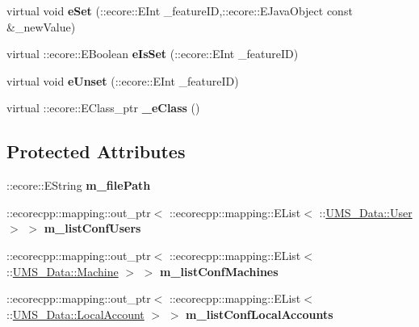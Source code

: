 \begin{DoxyCompactItemize}
\item 
\hypertarget{classUMS__Data_1_1Configuration_a7400afa4554020156b429da32c60e72b}{
virtual void {\bfseries eSet} (::ecore::EInt \_\-featureID,::ecore::EJavaObject const \&\_\-newValue)}
\label{classUMS__Data_1_1Configuration_a7400afa4554020156b429da32c60e72b}

\item 
\hypertarget{classUMS__Data_1_1Configuration_ad6423ada8bc590fbba7d014e52864a66}{
virtual ::ecore::EBoolean {\bfseries eIsSet} (::ecore::EInt \_\-featureID)}
\label{classUMS__Data_1_1Configuration_ad6423ada8bc590fbba7d014e52864a66}

\item 
\hypertarget{classUMS__Data_1_1Configuration_a84a50b257cc7b0b36cf4fce4ab4196d5}{
virtual void {\bfseries eUnset} (::ecore::EInt \_\-featureID)}
\label{classUMS__Data_1_1Configuration_a84a50b257cc7b0b36cf4fce4ab4196d5}

\item 
\hypertarget{classUMS__Data_1_1Configuration_acccaf6aeafe5396b942921b22f4aa018}{
virtual ::ecore::EClass\_\-ptr {\bfseries \_\-eClass} ()}
\label{classUMS__Data_1_1Configuration_acccaf6aeafe5396b942921b22f4aa018}

\end{DoxyCompactItemize}
\subsection*{Protected Attributes}
\begin{DoxyCompactItemize}
\item 
\hypertarget{classUMS__Data_1_1Configuration_a69205f3d42f08d9d8d95249fa00efb07}{
::ecore::EString {\bfseries m\_\-filePath}}
\label{classUMS__Data_1_1Configuration_a69205f3d42f08d9d8d95249fa00efb07}

\item 
\hypertarget{classUMS__Data_1_1Configuration_ac9817810ecc3c3bff71ba0c00e588532}{
::ecorecpp::mapping::out\_\-ptr$<$ ::ecorecpp::mapping::EList$<$ ::\hyperlink{classUMS__Data_1_1User}{UMS\_\-Data::User} $>$ $>$ {\bfseries m\_\-listConfUsers}}
\label{classUMS__Data_1_1Configuration_ac9817810ecc3c3bff71ba0c00e588532}

\item 
\hypertarget{classUMS__Data_1_1Configuration_aec33215349a001ade6546e95f009a5d2}{
::ecorecpp::mapping::out\_\-ptr$<$ ::ecorecpp::mapping::EList$<$ ::\hyperlink{classUMS__Data_1_1Machine}{UMS\_\-Data::Machine} $>$ $>$ {\bfseries m\_\-listConfMachines}}
\label{classUMS__Data_1_1Configuration_aec33215349a001ade6546e95f009a5d2}

\item 
\hypertarget{classUMS__Data_1_1Configuration_af0873397a1b10d4730934fcc936a8d7b}{
::ecorecpp::mapping::out\_\-ptr$<$ ::ecorecpp::mapping::EList$<$ ::\hyperlink{classUMS__Data_1_1LocalAccount}{UMS\_\-Data::LocalAccount} $>$ $>$ {\bfseries m\_\-listConfLocalAccounts}}
\label{classUMS__Data_1_1Configuration_af0873397a1b10d4730934fcc936a8d7b}

\end{DoxyCompactItemize}


